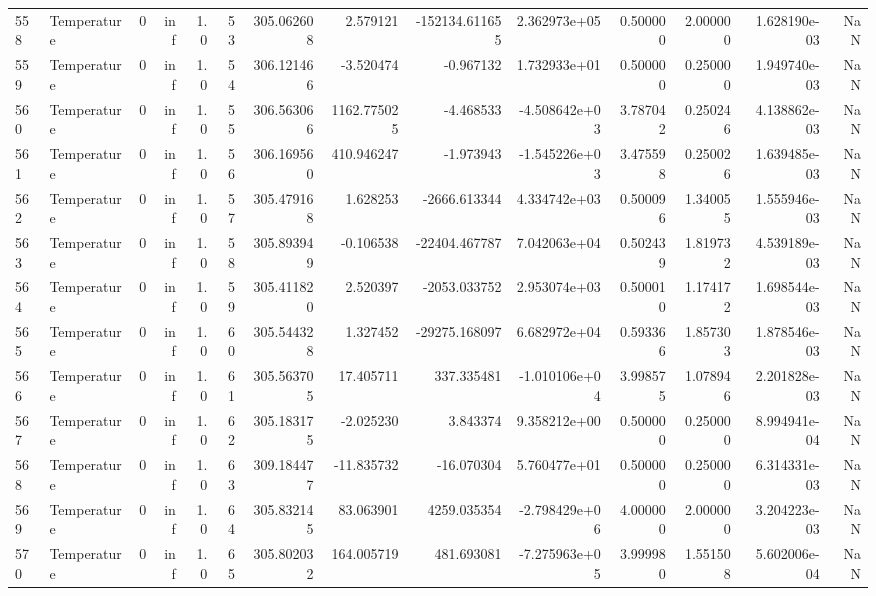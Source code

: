 \begin{tabular}{llrrrrrrrrrrrr}
558 &  Temperature &       0 &  inf &  1.0 &   53 &  305.062608 &     2.579121 & -152134.611655 &  2.362973e+05 &  0.500000 &  2.000000 &  1.628190e-03 &      NaN \\
559 &  Temperature &       0 &  inf &  1.0 &   54 &  306.121466 &    -3.520474 &      -0.967132 &  1.732933e+01 &  0.500000 &  0.250000 &  1.949740e-03 &      NaN \\
560 &  Temperature &       0 &  inf &  1.0 &   55 &  306.563066 &  1162.775025 &      -4.468533 & -4.508642e+03 &  3.787042 &  0.250246 &  4.138862e-03 &      NaN \\
561 &  Temperature &       0 &  inf &  1.0 &   56 &  306.169560 &   410.946247 &      -1.973943 & -1.545226e+03 &  3.475598 &  0.250026 &  1.639485e-03 &      NaN \\
562 &  Temperature &       0 &  inf &  1.0 &   57 &  305.479168 &     1.628253 &   -2666.613344 &  4.334742e+03 &  0.500096 &  1.340055 &  1.555946e-03 &      NaN \\
563 &  Temperature &       0 &  inf &  1.0 &   58 &  305.893949 &    -0.106538 &  -22404.467787 &  7.042063e+04 &  0.502439 &  1.819732 &  4.539189e-03 &      NaN \\
564 &  Temperature &       0 &  inf &  1.0 &   59 &  305.411820 &     2.520397 &   -2053.033752 &  2.953074e+03 &  0.500010 &  1.174172 &  1.698544e-03 &      NaN \\
565 &  Temperature &       0 &  inf &  1.0 &   60 &  305.544328 &     1.327452 &  -29275.168097 &  6.682972e+04 &  0.593366 &  1.857303 &  1.878546e-03 &      NaN \\
566 &  Temperature &       0 &  inf &  1.0 &   61 &  305.563705 &    17.405711 &     337.335481 & -1.010106e+04 &  3.998575 &  1.078946 &  2.201828e-03 &      NaN \\
567 &  Temperature &       0 &  inf &  1.0 &   62 &  305.183175 &    -2.025230 &       3.843374 &  9.358212e+00 &  0.500000 &  0.250000 &  8.994941e-04 &      NaN \\
568 &  Temperature &       0 &  inf &  1.0 &   63 &  309.184477 &   -11.835732 &     -16.070304 &  5.760477e+01 &  0.500000 &  0.250000 &  6.314331e-03 &      NaN \\
569 &  Temperature &       0 &  inf &  1.0 &   64 &  305.832145 &    83.063901 &    4259.035354 & -2.798429e+06 &  4.000000 &  2.000000 &  3.204223e-03 &      NaN \\
570 &  Temperature &       0 &  inf &  1.0 &   65 &  305.802032 &   164.005719 &     481.693081 & -7.275963e+05 &  3.999980 &  1.551508 &  5.602006e-04 &      NaN \\

\end{tabular}
